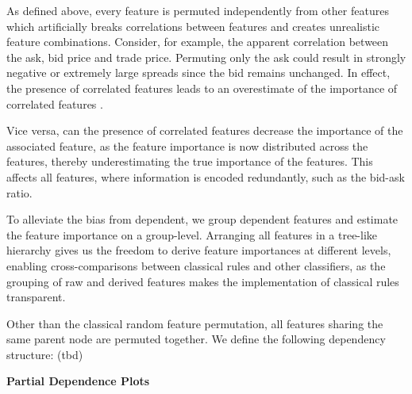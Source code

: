 As defined above, every feature is permuted independently from other features which artificially breaks correlations between features and creates unrealistic feature combinations. Consider, for example, the apparent correlation between the ask, bid price and trade price. Permuting only the ask could result in strongly negative or extremely large spreads since the bid remains unchanged. In effect, the presence of correlated features leads to an overestimate of the importance of correlated features \autocite[][3]{stroblConditionalVariableImportance2008}.

Vice versa, can the presence of correlated features decrease the importance of the associated feature, as the feature importance is now distributed across the features, thereby underestimating the true importance of the features. This affects all features, where information is encoded redundantly, such as the bid-ask ratio.


To alleviate the bias from dependent, we group dependent features and estimate the feature importance on a group-level. Arranging all features in a tree-like hierarchy gives us the freedom to derive feature importances at different levels, enabling cross-comparisons between classical rules and other classifiers, as the grouping of raw and derived features makes the implementation of classical rules transparent.


Other than the classical random feature permutation, all features sharing the same parent node are permuted together. We define the following dependency structure:
(tbd)

\textbf{Partial Dependence Plots}

